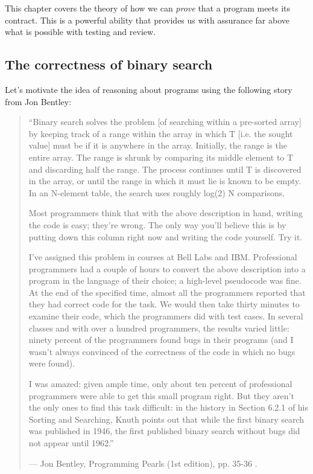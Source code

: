This chapter covers the theory of how we can \emph{prove} that a program meets its contract. This is a powerful ability that provides us with assurance far above what is possible with testing and review.

\subsection{The correctness of binary search}

Let's motivate the idea of reasoning about programs using the following story from Jon Bentley:

\begin{quote}
``Binary search solves the problem [of searching within a pre-sorted array] by keeping track of a range within the array in which T [i.e. the sought value] must be if it is anywhere in the array.  Initially, the range is the entire array.  The range is shrunk by comparing its middle element to T and discarding half the range.  The process continues until T is discovered in the array, or until the range in which it must lie is known to be empty.  In an N-element table, the search uses roughly log(2) N comparisons.

Most programmers think that with the above description in hand, writing the code is easy; they're wrong.  The only way you'll believe this is by putting down this column right now and writing the code yourself.  Try it.


I've assigned this problem in courses at Bell Labs and IBM.  Professional programmers had a couple of hours to convert the above description into a program in the language of their choice; a high-level pseudocode was fine.  At the end of the specified time, almost all the programmers reported that they had correct code for the task.  We would then take thirty minutes to examine their code, which the programmers did with test cases.  In several classes and with over a hundred programmers, the results varied little: ninety percent of the programmers found bugs in their programs (and I wasn't always convinced of the correctness of the code in which no bugs were found).

I was amazed: given ample time, only about ten percent of professional programmers were able to get this small program right.  But they aren't the only ones to find this task difficult: in the history in Section 6.2.1 of his Sorting and Searching, Knuth points out that while the first binary search was published in 1946, the first published binary search without bugs did not appear until 1962.''

 --- Jon Bentley, Programming Pearls (1st edition), pp. 35-36 \cite{bentley00}.
\end{quote}


